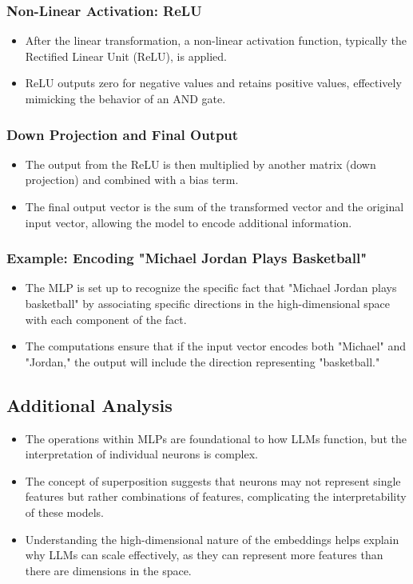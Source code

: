 \documentclass{article}
\begin{document}
\subsubsection*{Non-Linear Activation: ReLU}
\begin{itemize}
\item After the linear transformation, a non-linear activation function, typically the Rectified Linear Unit (ReLU), is applied.
\item ReLU outputs zero for negative values and retains positive values, effectively mimicking the behavior of an AND gate.
\end{itemize}

\subsubsection*{Down Projection and Final Output}
\begin{itemize}
\item The output from the ReLU is then multiplied by another matrix (down projection) and combined with a bias term.
\item The final output vector is the sum of the transformed vector and the original input vector, allowing the model to encode additional information.
\end{itemize}

\subsubsection*{Example: Encoding "Michael Jordan Plays Basketball"}
\begin{itemize}
\item The MLP is set up to recognize the specific fact that "Michael Jordan plays basketball" by associating specific directions in the high-dimensional space with each component of the fact.
\item The computations ensure that if the input vector encodes both "Michael" and "Jordan," the output will include the direction representing "basketball."
\end{itemize}

\subsection*{Additional Analysis}
\begin{itemize}
\item The operations within MLPs are foundational to how LLMs function, but the interpretation of individual neurons is complex.
\item The concept of superposition suggests that neurons may not represent single features but rather combinations of features, complicating the interpretability of these models.
\item Understanding the high-dimensional nature of the embeddings helps explain why LLMs can scale effectively, as they can represent more features than there are dimensions in the space.
\end{itemize}
\end{document}
